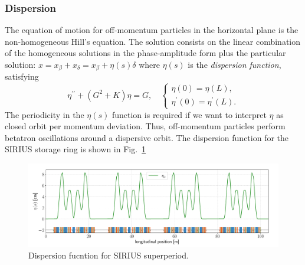 \subsubsection{Dispersion}
The equation of motion for off-momentum particles in the horizontal plane is the non-homogeneous Hill's equation. The solution consists on the linear combination of the homogeneous solutions in the phase-amplitude form plus the particular solution: $x=x_\beta+ x_\delta = x_\beta+ \eta(s)\delta $ where $\eta(s)$ is the \textit{dispersion function}, satisfying
    \begin{equation*}
        \eta^{\prime\prime}+(G^2+K)\eta=G,\quad
        \begin{cases}
            \eta(0) = \eta(L),\\
            \eta^\prime(0) = \eta^\prime(L).
        \end{cases}
    \end{equation*}
    The periodicity in the $\eta(s)$ function is required if we want to interpret $\eta$ as closed orbit per momentum deviation. Thus, off-momentum particles perform betatron oscillations around a dispersive orbit. The dispersion function for the SIRIUS storage ring is shown in Fig.~\ref{dispersion_func}
    \begin{figure}[htb]
        \centering
        \includegraphics[width=\textwidth]{Images/dispersion.pdf}
        \caption{Dispersion fucntion for SIRIUS superperiod.}
        \label{dispersion_func}
    \end{figure}
